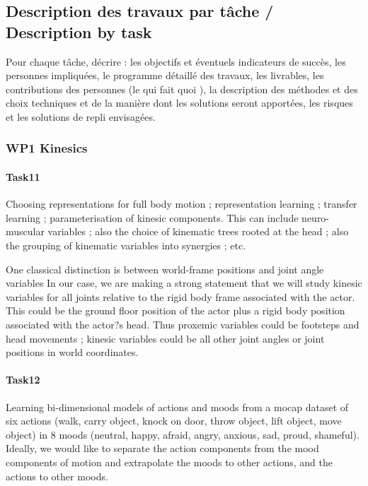 
\subsection{Description des travaux par tâche / Description by task}
\begin{xcomment}  
Pour chaque tâche, d\'ecrire : 
les objectifs et \'eventuels indicateurs de succ\`es,
les personnes impliqu\'ees,
le programme d\'etaill\'e des travaux,
les livrables,
les contributions des personnes (le qui fait quoi ),
la description des m\'ethodes et des choix techniques et de la mani\`ere dont les solutions seront apport\'ees,
les risques et les solutions de repli envisag\'ees.
\end{xcomment}


\subsubsection{WP1 Kinesics}

\paragraph{Task11}  Choosing representations for full body motion ; representation learning ; transfer learning ; parameterisation of kinesic components. This can include neuro-muscular variables ; also the choice of kinematic trees rooted at the head ; also the grouping of kinematic variables into synergies ; etc. 

One classical distinction is between world-frame positions and joint angle variables In our case, we are making a strong statement that we will  study kinesic variables for all joints relative to the rigid body frame associated with the actor. This could be the ground floor position of the actor plus a rigid body position associated with the actor?s head.  Thus proxemic variables could be footsteps and head movements ; kinesic variables could be all other joint angles or joint positions in world coordinates.

\paragraph{Task12} Learning bi-dimensional models of actions and moods from a mocap dataset of six actions (walk, carry object, knock on door, throw object, lift object, move object) in 8 moods (neutral, happy, afraid, angry, anxious, sad, proud, shameful). Ideally, we would like to separate the action components from the mood components of motion and extrapolate the moods to other actions, and the actions to other moods. 

